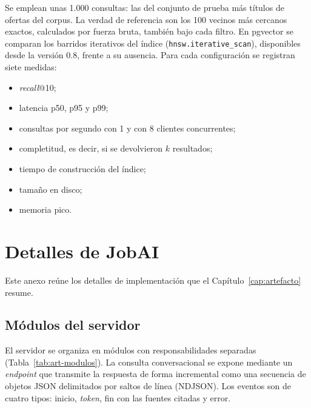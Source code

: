 Se emplean unas 1.000 consultas: las del conjunto de prueba más títulos de ofertas del corpus. La verdad de referencia son los 100 vecinos más cercanos exactos, calculados por fuerza bruta, también bajo cada filtro. En pgvector se comparan los barridos iterativos del índice (\texttt{hnsw.\allowbreak iterative\_scan}), disponibles desde la versión 0.8, frente a su ausencia. Para cada configuración se registran siete medidas:
\begin{itemize}
    \item \textit{recall}@10;
    \item latencia p50, p95 y p99;
    \item consultas por segundo con 1 y con 8 clientes concurrentes;
    \item completitud, es decir, si se devolvieron $k$ resultados;
    \item tiempo de construcción del índice;
    \item tamaño en disco;
    \item memoria pico.
\end{itemize}

\chapter{Detalles de JobAI}
\label{anx:artefacto}

Este anexo reúne los detalles de implementación que el Capítulo~\ref{cap:artefacto} resume.

\section{Módulos del servidor}

El servidor se organiza en módulos con responsabilidades separadas (Tabla~\ref{tab:art-modulos}). La consulta conversacional se expone mediante un \textit{endpoint} que transmite la respuesta de forma incremental como una secuencia de objetos JSON delimitados por saltos de línea (NDJSON). Los eventos son de cuatro tipos: inicio, \textit{token}, fin con las fuentes citadas y error.

